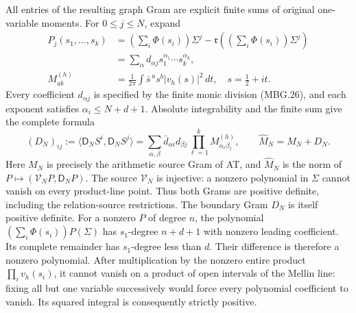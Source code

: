 All entries of the resulting graph Gram are explicit finite sums of
original one-variable moments. For \(0\le j\le N\), expand
\[
 \begin{aligned}
 P_j(s_1,\ldots,s_k)&=
  \left(\sum_i\Phi(s_i)\right)\Sigma^j
       -\mathfrak r\!\left(\left(\sum_i\Phi(s_i)\right)\Sigma^j\right)
 \\&=\sum_{\alpha}d_{\alpha j}s_1^{\alpha_1}\cdots s_k^{\alpha_k},\\
 M_{ab}^{(h)}&=\frac1{2\pi}\int
    \bar s^{\,a}s^b|v_h(s)|^2\,dt,\quad s=\tfrac12+it .
 \end{aligned}
 \tag{MBG.28}\label{eq:mbg-coefficients}
\]
Every coefficient \(d_{\alpha j}\) is specified by the finite monic
division (MBG.26), and each exponent satisfies
\(\alpha_i\le N+d+1\). Absolute integrability and the finite sum
give the complete formula
\[
 (D_N)_{ij}:=\langle\mathsf D_NS^i,\mathsf D_NS^j\rangle
   =\sum_{\alpha,\beta}\bar d_{\alpha i}d_{\beta j}
                          \prod_{\ell=1}^k M_{\alpha_\ell\beta_\ell}^{(h)},
 \qquad \widehat M_N=M_N+D_N .
 \tag{MBG.29}\label{eq:mbg-finite-window-gram}
\]
Here \(M_N\) is precisely the arithmetic source Gram of AT, and
\(\widehat M_N\) is the norm of
\(P\mapsto(\mathcal V_NP,\mathsf D_NP)\). The source
\(\mathcal V_N\) is injective: a nonzero polynomial in \(\Sigma\)
cannot vanish on every product-line point. Thus both Grams are
positive definite, including the relation-source restrictions.
The boundary Gram \(D_N\) is itself positive definite. For a
nonzero \(P\) of degree \(n\), the polynomial
\((\sum_i\Phi(s_i))P(\Sigma)\) has \(s_1\)-degree \(n+d+1\)
with nonzero leading coefficient. Its complete remainder has
\(s_1\)-degree less than \(d\). Their difference is therefore a
nonzero polynomial. After multiplication by the nonzero entire
product \(\prod_i v_h(s_i)\), it cannot vanish on a product of
open intervals of the Mellin line: fixing all but one variable
successively would force every polynomial coefficient to vanish.
Its squared integral is consequently strictly positive.

